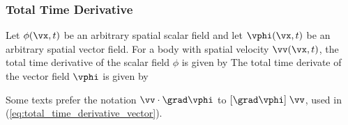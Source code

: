 \subsubsection{Total Time Derivative}
Let $\phi(\vx,t)$ be an arbitrary spatial scalar field and
let $\vphi(\vx,t)$ be an arbitrary spatial vector field.
For a body with spatial velocity $\vv(\vx, t)$, the total
time derivative of the scalar field $\phi$ is given by
\be
{}
 \label{eq:total_time_derivative_scalar}
\ee
The total time derivate of the vector field $\vphi$ is given by
\be
{}
\ee
\begin{Hremark}
Some texts prefer the notation $\vv \cdot \grad \vphi$ to
$[\grad \vphi] \; \vv$, used in 
(\ref{eq:total_time_derivative_vector}).
\end{Hremark}


